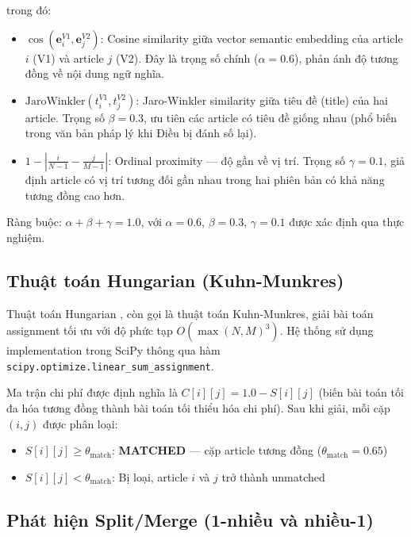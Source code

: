 trong đó:

\begin{itemize}
    \item $\cos(\mathbf{e}_i^{V1}, \mathbf{e}_j^{V2})$: Cosine similarity giữa vector semantic embedding của article $i$ (V1) và article $j$ (V2). Đây là trọng số chính ($\alpha = 0.6$), phản ánh độ tương đồng về nội dung ngữ nghĩa.
    \item $\text{JaroWinkler}(t_i^{V1}, t_j^{V2})$: Jaro-Winkler similarity \cite{winkler1990string} giữa tiêu đề (title) của hai article. Trọng số $\beta = 0.3$, ưu tiên các article có tiêu đề giống nhau (phổ biến trong văn bản pháp lý khi Điều bị đánh số lại).
    \item $1 - |\frac{i}{N-1} - \frac{j}{M-1}|$: Ordinal proximity — độ gần về vị trí. Trọng số $\gamma = 0.1$, giả định article có vị trí tương đối gần nhau trong hai phiên bản có khả năng tương đồng cao hơn.
\end{itemize}

Ràng buộc: $\alpha + \beta + \gamma = 1.0$, với $\alpha = 0.6$, $\beta = 0.3$, $\gamma = 0.1$ được xác định qua thực nghiệm.

\subsection{Thuật toán Hungarian (Kuhn-Munkres)}

Thuật toán Hungarian \cite{kuhn1955hungarian}, còn gọi là thuật toán Kuhn-Munkres, giải bài toán assignment tối ưu với độ phức tạp $O(\max(N, M)^3)$. Hệ thống sử dụng implementation trong SciPy \cite{scipy2020} thông qua hàm \texttt{scipy.optimize.linear\_sum\_assignment}.

Ma trận chi phí được định nghĩa là $C[i][j] = 1.0 - S[i][j]$ (biến bài toán tối đa hóa tương đồng thành bài toán tối thiểu hóa chi phí). Sau khi giải, mỗi cặp $(i, j)$ được phân loại:

\begin{itemize}
    \item $S[i][j] \geq \theta_{\text{match}}$: \textbf{MATCHED} — cặp article tương đồng ($\theta_{\text{match}} = 0.65$)
    \item $S[i][j] < \theta_{\text{match}}$: Bị loại, article $i$ và $j$ trở thành unmatched
\end{itemize}

\subsection{Phát hiện Split/Merge (1-nhiều và nhiều-1)}

